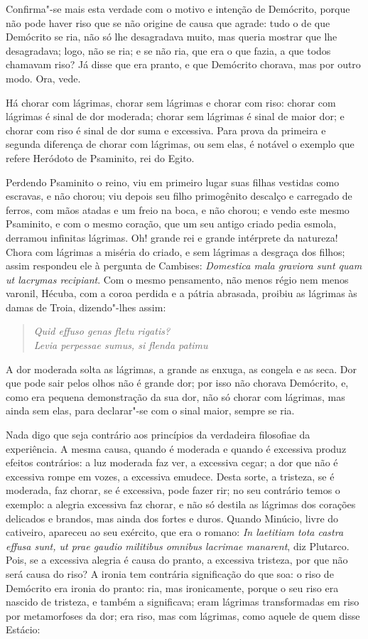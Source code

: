 Confirma"-se mais esta verdade com o motivo e intenção de Demócrito,
porque não pode haver riso que se não origine de causa que agrade: tudo
o de que Demócrito se ria, não só lhe desagradava muito, mas queria
mostrar que lhe desagradava; logo, não se ria; e se não ria, que era o
que fazia, a que todos chamavam riso? Já disse que era pranto, e que
Demócrito chorava, mas por outro modo. Ora, vede.

Há chorar com lágrimas, chorar sem lágrimas e chorar com riso: chorar
com lágrimas é sinal de dor moderada; chorar sem lágrimas é sinal de
maior dor; e chorar com riso é sinal de dor suma e excessiva. Para prova
da primeira e segunda diferença de chorar com lágrimas, ou sem elas, é
notável o exemplo que refere Heródoto de Psaminito, rei do Egito.

Perdendo Psaminito o reino, viu em primeiro lugar suas filhas vestidas
como escravas, e não chorou; viu depois seu filho primogênito descalço e
carregado de ferros, com mãos atadas e um freio na boca, e não chorou; e
vendo este mesmo Psaminito, e com o mesmo coração, que um seu antigo
criado pedia esmola, derramou infinitas lágrimas. Oh! grande rei e
grande intérprete da natureza! Chora com lágrimas a miséria do criado, e
sem lágrimas a desgraça dos filhos; assim respondeu ele à
pergunta de Cambises: \emph{Domestica mala graviora sunt quam ut
lacrymas recipiant}.
Com o mesmo pensamento, não menos régio nem menos varonil, Hécuba, com
a coroa perdida e a pátria abrasada, proibiu as lágrimas às damas de
Troia, dizendo"-lhes assim:

\begin{verse}
\emph{Quid effuso genas fletu rigatis?}\\
\emph{Levia perpessae sumus, si flenda patimu}
\end{verse}

A dor moderada solta as lágrimas, a grande as enxuga, as congela e as
seca. Dor que pode sair pelos olhos não é grande dor; por isso não
chorava Demócrito, e, como era pequena demonstração da sua dor, não só
chorar com lágrimas, mas ainda sem elas, para declarar"-se com o sinal
maior, sempre se ria.

Nada digo que seja contrário aos princípios da
verdadeira filosofiae da experiência. A mesma causa, quando é moderada e
quando é excessiva produz efeitos contrários: a luz moderada faz ver, a
excessiva cegar; a dor que não é excessiva rompe em vozes, a excessiva
emudece. Desta sorte, a tristeza, se é moderada, faz chorar, se é
excessiva, pode fazer rir; no seu contrário temos o exemplo: a alegria
excessiva faz chorar, e não só destila as lágrimas dos corações
delicados e brandos, mas ainda dos fortes e duros. Quando Minúcio, livre
do cativeiro, apareceu ao seu exército, que era o romano: \emph{In
laetitiam tota castra effusa sunt, ut prae gaudio militibus omnibus lacrimae
manarent}, diz Plutarco. Pois, se a excessiva alegria é causa do pranto, a excessiva
tristeza, por que não será causa do riso? A ironia tem contrária
significação do que soa: o riso de Demócrito era ironia do pranto: ria,
mas ironicamente, porque o seu riso era nascido de tristeza, e também a
significava; eram lágrimas transformadas em riso por metamorfoses da
dor; era riso, mas com lágrimas, como aquele de quem disse Estácio:

